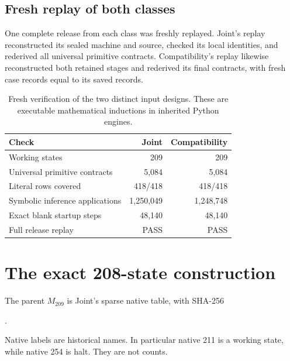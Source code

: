 \documentclass[11pt,letterpaper]{article}
\newcommand{\old}{M_{209}}
\begin{document}
\subsection{Fresh replay of both classes}

One complete release from each class was freshly replayed. Joint's replay
reconstructed its sealed machine and source, checked its local identities,
and rederived all universal primitive contracts. Compatibility's replay
likewise reconstructed both retained stages and rederived its final
contracts, with fresh case records equal to its saved records.

\begin{table}[ht]
\centering
\begin{tabular}{@{}lrr@{}}
\toprule
Check & Joint & Compatibility\\
\midrule
Working states & 209 & 209\\
Universal primitive contracts & 5,084 & 5,084\\
Literal rows covered & 418/418 & 418/418\\
Symbolic inference applications & 1,250,049 & 1,248,748\\
Exact blank startup steps & 48,140 & 48,140\\
Full release replay & PASS & PASS\\
\bottomrule
\end{tabular}
\caption{Fresh verification of the two distinct input designs. These are
executable mathematical inductions in inherited Python engines.}
\end{table}

\section{The exact 208-state construction}
\label{sec:construction}

The parent \(\old\) is Joint's sparse native table, with SHA-256
\begin{center}\small
{}.
\end{center}
Native labels are historical names. In particular native 211 is a working
state, while native 254 is halt. They are not counts.
\end{document}
